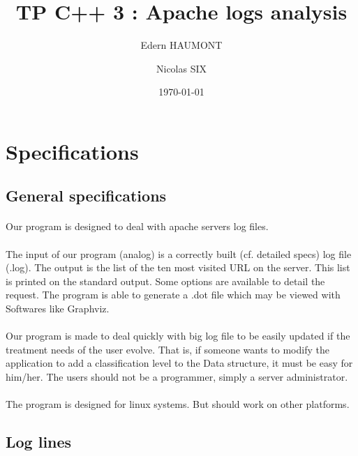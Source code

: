 \documentclass[a4paper, 12pts]{article}
\title{TP C++ 3 : Apache logs analysis}
\author{Edern HAUMONT}
\author{Nicolas SIX}
\affil{B3111}
\date{\today}
\begin{document}

\maketitle



\section{Specifications}
\subsection{General specifications}
\paragraph{}
Our program is designed to deal with apache servers log files.
\paragraph{}
The input of our program (analog) is a correctly built (cf. detailed specs) log file (.log). The output is the list of the ten most visited URL on the server. This list is printed on the standard output. Some options are available to detail the request. The program is able to generate a .dot file which may be viewed with Softwares like Graphviz.
\paragraph{}
 Our program is made to deal quickly with big log file to be easily updated if the treatment needs of the user evolve. That is, if someone wants to modify the application to add a classification level to the Data structure, it must be easy for him/her. The users should not be a programmer, simply a server administrator.
\paragraph{}
 The program is designed for linux systems. But should work on other platforms.

\subsection{Log lines}
\end{document}
